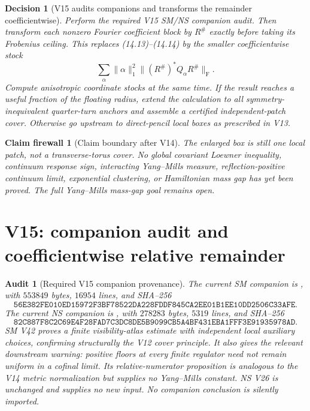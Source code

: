 \documentclass[11pt,oneside]{article}
\newtheorem{firewall}[theorem]{Claim firewall}
\newtheorem{audit}[theorem]{Audit}
\newtheorem{decision}[theorem]{Decision}
\theoremstyle{definition}
\theoremstyle{remark}
\begin{document}
\begin{decision}[V15 audits companions and transforms the remainder coefficientwise]
\label{dec:newv14-next}
Perform the required V15 SM/NS companion audit.  Then transform each
nonzero Fourier coefficient block by \(R^\#\) exactly before taking
its Frobenius ceiling.  This replaces (14.13)--(14.14) by the smaller
coefficientwise stock
\[
 \sum_\alpha\|\alpha\|_1^2
 \|(R^\#)^*Q_\alpha R^\#\|_{\mathrm F}.                  \tag{14.17}
\]
Compute anisotropic coordinate stocks at the same time.  If the
result reaches a useful fraction of the floating radius, extend the
calculation to all symmetry-inequivalent quarter-turn anchors and
assemble a certified independent-patch cover.  Otherwise go upstream
to direct-pencil local boxes as prescribed in V13.
\end{decision}

\begin{firewall}[Claim boundary after V14]
\label{fire:newv14-final}
The enlarged box is still one local patch, not a transverse-torus
cover.  No global covariant Loewner inequality, continuum response
sign, interacting Yang--Mills measure, reflection-positive continuum
limit, exponential clustering, or Hamiltonian mass gap has yet been
proved.  The full Yang--Mills mass-gap goal remains open.
\end{firewall}

\section{V15: companion audit and coefficientwise relative remainder}
\label{sec:newv15-audit-remainder}

\begin{audit}[Required V15 companion provenance]
\label{audit:newv15}
The current SM companion is
,
with \(553849\) bytes, \(16954\) lines, and SHA--256
\[
\texttt{56E382FE010ED15972F3BF78522DA228FDDF845CA2EE01B1EE10DD2506C33AFE}.
                                                               \tag{15.1}
\]
The current NS companion is
,
with \(278283\) bytes, \(5319\) lines, and SHA--256
\[
\texttt{82C887F8C2C69E4F28FAD7C3DC8DE5B9099CB5A4BF431EBA1FFF3E91935978AD}.
                                                               \tag{15.2}
\]
SM V42 proves a finite visibility-atlas estimate with independent
local auxiliary choices, confirming structurally the V12 cover
principle.  It also gives the relevant downstream warning: positive
floors at every finite regulator need not remain uniform in a cofinal
limit.  Its relative-numerator proposition is analogous to the V14
metric normalization but supplies no Yang--Mills constant.  NS V26
is unchanged and supplies no new input.  No companion conclusion is
silently imported.
\end{audit}
\end{document}
